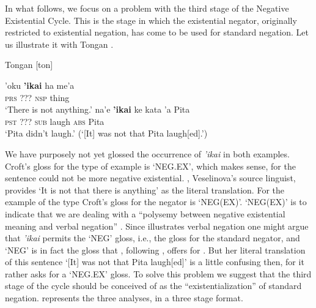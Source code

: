﻿\documentclass[output=paper]{langsci/langscibook}
\begin{document}
In what follows, we focus on a problem with the third stage of the Negative
Existential Cycle. This is the stage in which the existential negator,
originally restricted to existential negation, has come to be used for
standard negation. Let us illustrate it with Tongan 
\parencites(cp.)()[12]{Croft1991}[1342]{Veselinova2014}. 
%
\begin{exe}\ex\label{ex:int-tongan-anything-laugh}
          Tongan [ton] 
          \begin{xlist}
    \ex\label{ex:int-tongan-anything}
    \gll 'oku  \textbf{'ikai}  ha  me'a \\
    \textsc{prs}  ???  \textsc{nsp}  thing \\
    \glt `There is not anything.'
    \ex\label{ex:int-tongan-laugh}
    \gll na'e  \textbf{'ikai}  ke  kata  'a  Pita\\
\textsc{pst}  ???  \textsc{sub}  laugh  \textsc{abs}  Pita\\
    \glt `Pita didn't laugh.' (`[It] was not that Pita laugh[ed].')
    \end{xlist}\end{exe}
%
We have purposely not yet glossed the occurrence of \textit{'ikai} in
both examples. Croft's gloss for the  type of example is
`NEG.EX', which makes sense, for the sentence could not be more negative
existential. \textcite[101]{Broschart1999}, Veselinova's source linguist,
provides `It is not that there is anything' as the literal translation. For
the example of the  type Croft's gloss for the negator is
`NEG(EX)'. `NEG(EX)' is to indicate that we are dealing with a ``polysemy
between negative existential meaning and verbal negation''
\parencite[12]{Croft1991}. Since  illustrates verbal negation
one might argue that \textit{'ikai} permits the `NEG' gloss, i.e., the
gloss for the standard negator, and `NEG' is in fact the gloss that
\textcite[1342]{Veselinova2014}, following \textcite[104]{Broschart1999}, offers
for . But her literal translation of this sentence `[It]
was not that Pita laugh[ed]' \parencite[in line again with][104]{Broschart1999}
 is a little confusing then, for it rather asks for a `NEG.EX' gloss.
To solve this problem we suggest that the third stage of the cycle should
be conceived of as the ``existentialization'' of standard negation.
 represents the three analyses, in a three stage format.
\end{document}
